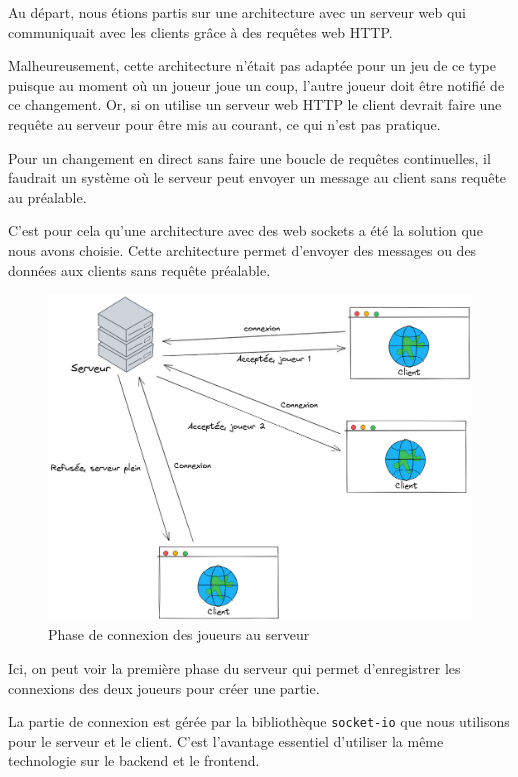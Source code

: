 Au départ, nous étions partis sur une architecture avec un serveur web qui communiquait avec les clients grâce à des requêtes web HTTP.

Malheureusement, cette architecture n'était pas adaptée pour un jeu de ce type puisque au moment où un joueur joue un coup, l'autre joueur doit être notifié de ce changement. Or, si on utilise un serveur web HTTP le client devrait faire une requête au serveur pour être mis au courant, ce qui n'est pas pratique.

Pour un changement en direct sans faire une boucle de requêtes continuelles, il faudrait un système où le serveur peut envoyer un message au client sans requête au préalable.

C'est pour cela qu'une architecture avec des web sockets a été la solution que nous avons choisie.
Cette architecture permet d'envoyer des messages ou des données aux clients sans requête préalable.

\begin{figure}[H]
    \centering
    \includegraphics[scale=0.25]{data/reseau_initialisation.png}
    \caption{Phase de connexion des joueurs au serveur}
\end{figure}

Ici, on peut voir la première phase du serveur qui permet d'enregistrer les connexions des deux joueurs pour créer une partie.

La partie de connexion est gérée par la bibliothèque {\tt socket-io} que nous utilisons pour le serveur et le client. C'est l'avantage essentiel d'utiliser la même technologie sur le backend et le frontend.

